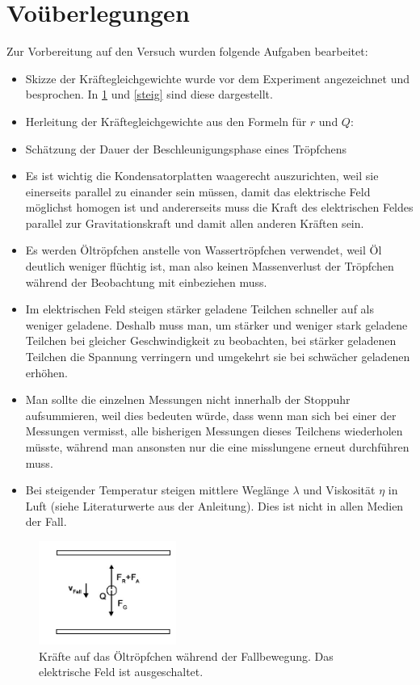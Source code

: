 \documentclass[
	a4paper,
	12pt,
	pagesize,
	ngerman
]{scrartcl}
\begin{document}
	\section{Voüberlegungen}
	Zur Vorbereitung auf den Versuch wurden folgende Aufgaben bearbeitet:
	\begin{itemize}
		\item Skizze der Kräftegleichgewichte wurde vor dem Experiment angezeichnet und besprochen. In \cref{fall} und \cref{steig} sind diese dargestellt.
		\item Herleitung der Kräftegleichgewichte aus den Formeln für $ r $ und $ Q $: %
		\item Schätzung der Dauer der Beschleunigungsphase eines Tröpfchens %
		\item Es ist wichtig die Kondensatorplatten waagerecht auszurichten, weil sie einerseits parallel zu einander sein müssen, damit das elektrische Feld möglichst homogen ist und andererseits muss die Kraft des elektrischen Feldes parallel zur Gravitationskraft und damit allen anderen Kräften sein.
		\item Es werden Öltröpfchen anstelle von Wassertröpfchen verwendet, weil Öl deutlich weniger flüchtig ist, man also keinen Massenverlust der Tröpfchen während der Beobachtung mit einbeziehen muss.
		\item Im elektrischen Feld steigen stärker geladene Teilchen schneller auf als weniger geladene. Deshalb muss man, um stärker und weniger stark geladene Teilchen bei gleicher Geschwindigkeit zu beobachten, bei stärker geladenen Teilchen die Spannung verringern und umgekehrt sie bei schwächer geladenen erhöhen.
		\item Man sollte die einzelnen Messungen nicht innerhalb der Stoppuhr aufsummieren, weil dies bedeuten würde, dass wenn man sich bei einer der Messungen vermisst, alle bisherigen Messungen dieses Teilchens wiederholen müsste, während man ansonsten nur die eine misslungene erneut durchführen muss.
		\item Bei steigender Temperatur steigen mittlere Weglänge $ \lambda $ und Viskosität $ \eta $ in Luft (siehe Literaturwerte aus der Anleitung). %
		Dies ist nicht in allen Medien der Fall.
	\end{itemize}
	\begin{figure}[H]
		\includegraphics[width=0.4\textwidth]{fall}
		\centering
		\caption{Kräfte auf das Öltröpfchen während der Fallbewegung. Das elektrische Feld ist ausgeschaltet.\cite{RCL}}
		\label{fall}
		\centering
	\end{figure} 
\end{document}
